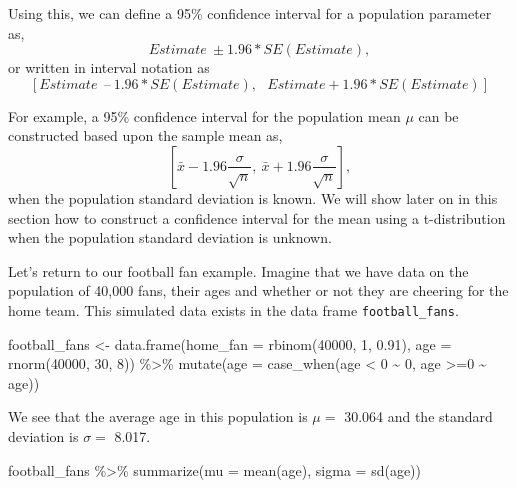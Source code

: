 \documentclass[
  letterpaper,
  DIV=11,
  numbers=noendperiod]{scrreprt}
\newenvironment{Shaded}{\begin{snugshade}}{\end{snugshade}}
\newcommand{\AttributeTok}[1]{\textcolor[rgb]{0.40,0.45,0.13}{#1}}
\newcommand{\DecValTok}[1]{\textcolor[rgb]{0.68,0.00,0.00}{#1}}
\newcommand{\FloatTok}[1]{\textcolor[rgb]{0.68,0.00,0.00}{#1}}
\newcommand{\FunctionTok}[1]{\textcolor[rgb]{0.28,0.35,0.67}{#1}}
\newcommand{\NormalTok}[1]{\textcolor[rgb]{0.00,0.23,0.31}{#1}}
\newcommand{\OtherTok}[1]{\textcolor[rgb]{0.00,0.23,0.31}{#1}}
\newcommand{\SpecialCharTok}[1]{\textcolor[rgb]{0.37,0.37,0.37}{#1}}
\theoremstyle{definition}
\theoremstyle{remark}
\begin{document}
Using this, we can define a 95\% confidence interval for a population
parameter as, \[Estimate \ \pm 1.96*SE(Estimate),\] or written in
interval notation as
\[[Estimate \ \ – \ 1.96*SE(Estimate),\ \ \ Estimate + 1.96*SE(Estimate)]\]

For example, a 95\% confidence interval for the population mean \(\mu\)
can be constructed based upon the sample mean as,
\[[\bar{x} - 1.96\frac{\sigma}{\sqrt{n}}, \ \bar{x} + 1.96\frac{\sigma}{\sqrt{n}}],\]
when the population standard deviation is known. We will show later on
in this section how to construct a confidence interval for the mean
using a t-distribution when the population standard deviation is
unknown.

Let's return to our football fan example. Imagine that we have data on
the population of 40,000 fans, their ages and whether or not they are
cheering for the home team. This simulated data exists in the data frame
\texttt{football\_fans}.

\begin{Shaded}
\begin{Highlighting}[]
\NormalTok{football\_fans }\OtherTok{\textless{}{-}} \FunctionTok{data.frame}\NormalTok{(}\AttributeTok{home\_fan =} \FunctionTok{rbinom}\NormalTok{(}\DecValTok{40000}\NormalTok{, }\DecValTok{1}\NormalTok{, }\FloatTok{0.91}\NormalTok{),}
                            \AttributeTok{age =} \FunctionTok{rnorm}\NormalTok{(}\DecValTok{40000}\NormalTok{, }\DecValTok{30}\NormalTok{, }\DecValTok{8}\NormalTok{)) }\SpecialCharTok{\%\textgreater{}\%}
  \FunctionTok{mutate}\NormalTok{(}\AttributeTok{age =} \FunctionTok{case\_when}\NormalTok{(age }\SpecialCharTok{\textless{}} \DecValTok{0} \SpecialCharTok{\textasciitilde{}} \DecValTok{0}\NormalTok{,}
\NormalTok{                         age }\SpecialCharTok{\textgreater{}=}\DecValTok{0} \SpecialCharTok{\textasciitilde{}}\NormalTok{ age))}
\end{Highlighting}
\end{Shaded}

We see that the average age in this population is \(\mu =\) 30.064 and
the standard deviation is \(\sigma =\) 8.017.

\begin{Shaded}
\begin{Highlighting}[]
\NormalTok{football\_fans }\SpecialCharTok{\%\textgreater{}\%} 
  \FunctionTok{summarize}\NormalTok{(}\AttributeTok{mu =} \FunctionTok{mean}\NormalTok{(age),}
            \AttributeTok{sigma =} \FunctionTok{sd}\NormalTok{(age))}
\end{Highlighting}
\end{Shaded}
\end{document}
